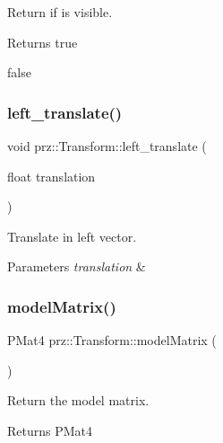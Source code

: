 Return if is visible. 

\begin{DoxyReturn}{Returns}
true 

false 
\end{DoxyReturn}
\mbox{\label{classprz_1_1_transform_a5f942740959b5816e2bb4e2789098782}} 
\subsubsection{\texorpdfstring{left\_translate()}{left\_translate()}}
{\footnotesize\ttfamily void prz\+::\+Transform\+::left\+\_\+translate (\begin{DoxyParamCaption}\item[{float}]{translation }\end{DoxyParamCaption})}



Translate in left vector. 


\begin{DoxyParams}{Parameters}
{\em translation} & \\
\hline
\end{DoxyParams}
\mbox{\label{classprz_1_1_transform_a18dd340b1dd295aac8cfb9a2846eb77f}} 
\subsubsection{\texorpdfstring{modelMatrix()}{modelMatrix()}}
{\footnotesize\ttfamily P\+Mat4 prz\+::\+Transform\+::model\+Matrix (\begin{DoxyParamCaption}{ }\end{DoxyParamCaption})}



Return the model matrix. 

\begin{DoxyReturn}{Returns}
P\+Mat4 
\end{DoxyReturn}
\mbox{\label{classprz_1_1_transform_ab97343c6d88125e347369511b80e8dc0}} 

